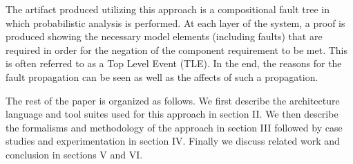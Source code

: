 The artifact produced utilizing this approach is a compositional fault tree in which probabilistic analysis is performed. At each layer of the system, a proof is produced showing the necessary model elements (including faults) that are required in order for the negation of the component requirement to be met. This is often referred to as a Top Level Event (TLE). In the end, the reasons for the fault propagation can be seen as well as the affects of such a propagation. 


The rest of the paper is organized as follows. We first describe the architecture language and tool suites used for this approach in section II. We then describe the formalisms and methodology of the approach in section III followed by case studies and experimentation in section IV. Finally we discuss related work and conclusion in sections V and VI.  
